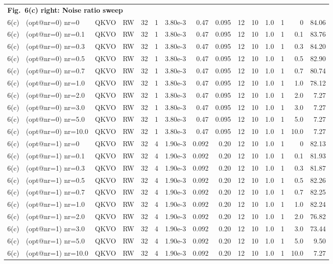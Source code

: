 \documentclass[AMA,LATO1COL]{WileyNJDv5}
\begin{document}
{\begin{longtable}{@{}l l l l r r r r r r r r r r r@{}}
\multicolumn{15}{l}{\cellcolor{HeadGray}\textbf{Fig.~6(c) right: Noise ratio sweep}} \\
6(c) & (opt@nr=0) nr=0 & QKVO & RW & 32 & 1 & 3.80e-3 & 0.47 & 0.095 & 12 & 10 & 1.0 & 1 & 0 & 84.06 \\
6(c) & (opt@nr=0) nr=0.1 & QKVO & RW & 32 & 1 & 3.80e-3 & 0.47 & 0.095 & 12 & 10 & 1.0 & 1 & 0.1 & 83.76 \\
6(c) & (opt@nr=0) nr=0.3 & QKVO & RW & 32 & 1 & 3.80e-3 & 0.47 & 0.095 & 12 & 10 & 1.0 & 1 & 0.3 & 84.20 \\
6(c) & (opt@nr=0) nr=0.5 & QKVO & RW & 32 & 1 & 3.80e-3 & 0.47 & 0.095 & 12 & 10 & 1.0 & 1 & 0.5 & 82.90 \\
6(c) & (opt@nr=0) nr=0.7 & QKVO & RW & 32 & 1 & 3.80e-3 & 0.47 & 0.095 & 12 & 10 & 1.0 & 1 & 0.7 & 80.74 \\
6(c) & (opt@nr=0) nr=1.0 & QKVO & RW & 32 & 1 & 3.80e-3 & 0.47 & 0.095 & 12 & 10 & 1.0 & 1 & 1.0 & 78.12 \\
6(c) & (opt@nr=0) nr=2.0 & QKVO & RW & 32 & 1 & 3.80e-3 & 0.47 & 0.095 & 12 & 10 & 1.0 & 1 & 2.0 & 7.27 \\
6(c) & (opt@nr=0) nr=3.0 & QKVO & RW & 32 & 1 & 3.80e-3 & 0.47 & 0.095 & 12 & 10 & 1.0 & 1 & 3.0 & 7.27 \\
6(c) & (opt@nr=0) nr=5.0 & QKVO & RW & 32 & 1 & 3.80e-3 & 0.47 & 0.095 & 12 & 10 & 1.0 & 1 & 5.0 & 7.27 \\
6(c) & (opt@nr=0) nr=10.0 & QKVO & RW & 32 & 1 & 3.80e-3 & 0.47 & 0.095 & 12 & 10 & 1.0 & 1 & 10.0 & 7.27 \\
6(c) & (opt@nr=1) nr=0 & QKVO & RW & 32 & 4 & 1.90e-3 & 0.092 & 0.20 & 12 & 10 & 1.0 & 1 & 0 & 82.13 \\
6(c) & (opt@nr=1) nr=0.1 & QKVO & RW & 32 & 4 & 1.90e-3 & 0.092 & 0.20 & 12 & 10 & 1.0 & 1 & 0.1 & 81.93 \\
6(c) & (opt@nr=1) nr=0.3 & QKVO & RW & 32 & 4 & 1.90e-3 & 0.092 & 0.20 & 12 & 10 & 1.0 & 1 & 0.3 & 81.87 \\
6(c) & (opt@nr=1) nr=0.5 & QKVO & RW & 32 & 4 & 1.90e-3 & 0.092 & 0.20 & 12 & 10 & 1.0 & 1 & 0.5 & 82.26 \\
6(c) & (opt@nr=1) nr=0.7 & QKVO & RW & 32 & 4 & 1.90e-3 & 0.092 & 0.20 & 12 & 10 & 1.0 & 1 & 0.7 & 82.25 \\
6(c) & (opt@nr=1) nr=1.0 & QKVO & RW & 32 & 4 & 1.90e-3 & 0.092 & 0.20 & 12 & 10 & 1.0 & 1 & 1.0 & 82.24 \\
6(c) & (opt@nr=1) nr=2.0 & QKVO & RW & 32 & 4 & 1.90e-3 & 0.092 & 0.20 & 12 & 10 & 1.0 & 1 & 2.0 & 76.82 \\
6(c) & (opt@nr=1) nr=3.0 & QKVO & RW & 32 & 4 & 1.90e-3 & 0.092 & 0.20 & 12 & 10 & 1.0 & 1 & 3.0 & 73.44 \\
6(c) & (opt@nr=1) nr=5.0 & QKVO & RW & 32 & 4 & 1.90e-3 & 0.092 & 0.20 & 12 & 10 & 1.0 & 1 & 5.0 & 9.50 \\
6(c) & (opt@nr=1) nr=10.0 & QKVO & RW & 32 & 4 & 1.90e-3 & 0.092 & 0.20 & 12 & 10 & 1.0 & 1 & 10.0 & 7.27 \\
\midrule


\end{longtable}}
\end{document}

